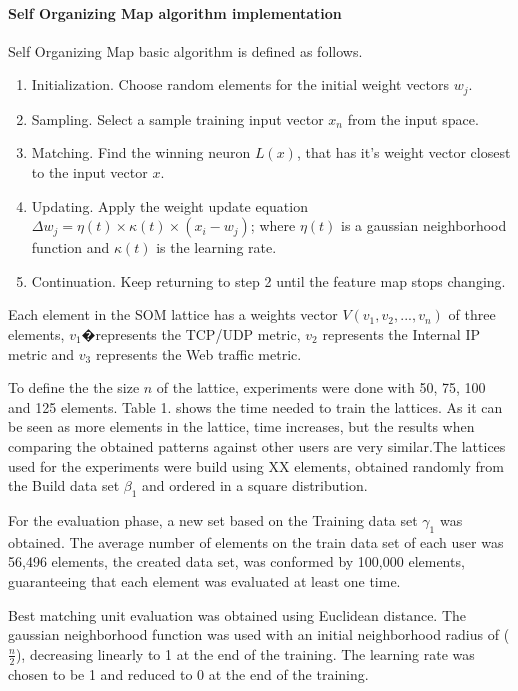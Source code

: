 \documentclass{article}
\begin{document}
\paragraph{Self Organizing Map algorithm implementation} %
Self Organizing Map basic algorithm is defined as follows.
\begin{enumerate}
\item Initialization. Choose random elements for the initial weight vectors $w_j$.
\item Sampling. Select a sample training input vector $x_n$ from the input space.
\item Matching. Find the winning neuron $L(x)$, that has it's weight vector closest to the input vector $x$.
\item Updating. Apply the weight update equation $\Delta w_j=\eta(t) \times \kappa(t) \times (x_i - w_j)$; where $\eta(t)$ is a gaussian neighborhood function and $\kappa(t)$ is the learning rate.
\item Continuation. Keep returning to step 2 until the feature map stops changing.
\end{enumerate}

Each element in the SOM lattice has a weights vector $V(v_1, v_2,..., v_n)$ of three elements, $v_1$�represents the TCP/UDP metric, $v_2$ represents the Internal IP metric and $v_3$ represents the Web traffic metric.

To define the the size $n$ of the lattice, experiments were done with 50, 75, 100 and 125 elements. Table 1. shows the time needed to train the lattices. As it can be seen as more elements in the lattice, time increases, but the results when comparing the obtained patterns against other users are very similar.The lattices used for the experiments were build using XX elements,  obtained randomly from the Build data set $\beta_1$ and ordered in a square distribution.

For the evaluation phase, a new set based on the Training data set $\gamma_1$ was obtained. The average number of elements on the train data set of each user was 56,496 elements, the created data set, was conformed by 100,000 elements, guaranteeing that each element was evaluated at least one time.

Best matching unit evaluation was obtained using Euclidean distance. The gaussian neighborhood function was used with an initial neighborhood radius of ($\frac{n}{2}$), decreasing linearly to 1 at the end of the training. The learning rate was chosen to be 1 and reduced to 0 at the end of the training.
\end{document}
